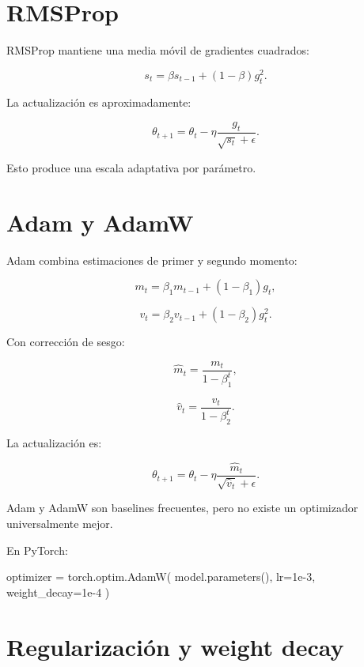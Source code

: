\documentclass[
  letterpaper,
  DIV=11,
  numbers=noendperiod]{scrartcl}
\newenvironment{Shaded}{\begin{snugshade}}{\end{snugshade}}
\newcommand{\FloatTok}[1]{\textcolor[rgb]{0.68,0.00,0.00}{#1}}
\newcommand{\NormalTok}[1]{\textcolor[rgb]{0.00,0.23,0.31}{#1}}
\newcommand{\OperatorTok}[1]{\textcolor[rgb]{0.37,0.37,0.37}{#1}}
\begin{document}
\section{RMSProp}\label{rmsprop}

RMSProp mantiene una media móvil de gradientes cuadrados:

\[
s_t
=
\beta s_{t-1}
+
(1-\beta)g_t^2.
\]

La actualización es aproximadamente:

\[
\theta_{t+1}
=
\theta_t
-
\eta
\frac{g_t}
{\sqrt{s_t}+\epsilon}.
\]

Esto produce una escala adaptativa por parámetro.

\section{Adam y AdamW}\label{adam-y-adamw}

Adam combina estimaciones de primer y segundo momento:

\[
m_t
=
\beta_1m_{t-1}
+
(1-\beta_1)g_t,
\]

\[
v_t
=
\beta_2v_{t-1}
+
(1-\beta_2)g_t^2.
\]

Con corrección de sesgo:

\[
\hat m_t
=
\frac{m_t}{1-\beta_1^t},
\]

\[
\hat v_t
=
\frac{v_t}{1-\beta_2^t}.
\]

La actualización es:

\[
\boxed{
\theta_{t+1}
=
\theta_t
-
\eta
\frac{\hat m_t}
{\sqrt{\hat v_t}+\epsilon}.
}
\]

Adam y AdamW son baselines frecuentes, pero no existe un optimizador
universalmente mejor.

En PyTorch:

\begin{Shaded}
\begin{Highlighting}[]
\NormalTok{optimizer }\OperatorTok{=}\NormalTok{ torch.optim.AdamW(}
\NormalTok{    model.parameters(),}
\NormalTok{    lr}\OperatorTok{=}\FloatTok{1e{-}3}\NormalTok{,}
\NormalTok{    weight\_decay}\OperatorTok{=}\FloatTok{1e{-}4}
\NormalTok{)}
\end{Highlighting}
\end{Shaded}

\section{Regularización y weight
decay}\label{regularizaciuxf3n-y-weight-decay}
\end{document}
